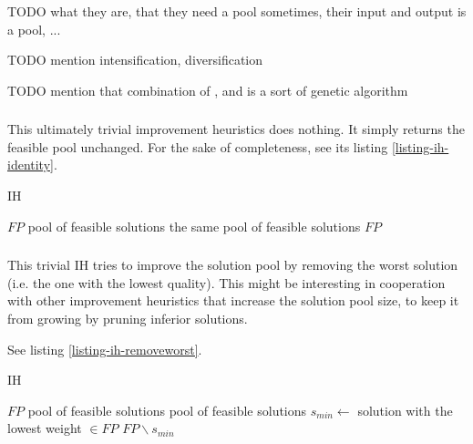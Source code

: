 
TODO what they are, that they need a pool sometimes, their input and output is a pool, ...

TODO mention intensification, diversification

TODO mention that combination of ,  and  is a sort of genetic algorithm

\subsubsection{}

This ultimately trivial improvement heuristics does nothing. It simply returns the feasible pool unchanged. For the sake of completeness, see its listing \ref{listing-ih-identity}.

\begin{algorithm}
\caption{ IH}
\label{listing-ih-identity}
\begin{algorithmic}
\REQUIRE $FP$ pool of feasible solutions
\ENSURE the same pool of feasible solutions
\RETURN $FP$
\end{algorithmic}
\end{algorithm}

\subsubsection{}

This trivial IH tries to improve the solution pool by removing the worst solution (i.e. the one with the lowest quality). This might be interesting in cooperation with other improvement heuristics that increase the solution pool size, to keep it from growing by pruning inferior solutions.

See listing \ref{listing-ih-removeworst}.

\begin{algorithm}
\caption{ IH}
\label{listing-ih-removeworst}
\begin{algorithmic}
\REQUIRE $FP$ pool of feasible solutions
\ENSURE pool of feasible solutions
\STATE $s_{min} \gets $ solution with the lowest weight $\in FP$
\RETURN $FP \backslash s_{min}$
\end{algorithmic}
\end{algorithm}

\subsubsection{}

